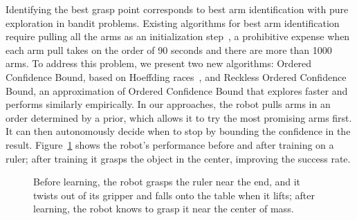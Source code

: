 \documentclass{article}
\newcommand{\algorithmCTxt}{Ordered Confidence Bound\xspace}
\newcommand{\algorithmDTxt}{Reckless Ordered Confidence Bound\xspace}
\begin{document}
Identifying the best grasp point corresponds to best arm
identification with pure exploration in bandit problems.  Existing
algorithms for best arm identification require pulling all the arms as
an initialization step~\citep{mannor04, audibert10, chen14}, a
prohibitive expense when each arm pull takes on the order of 90
seconds and there are more than 1000 arms.  To address this problem,
we present two new algorithms: \algorithmCTxt, based on Hoeffding
races~\citep{maron93}, and \algorithmDTxt, an approximation of
\algorithmCTxt that explores faster and performs similarly
empirically. In our approaches, the robot pulls arms in an order
determined by a prior, which allows it to try the most promising arms
first. It can then autonomously decide when to stop by bounding the
confidence in the result.  Figure~\ref{fig:ruler} shows the robot's
performance before and after training on a ruler; after training it
grasps the object in the center, improving the success rate.
\begin{figure}
%
\caption{Before learning, the robot grasps the ruler near the end, and it twists out of its gripper and falls onto the table when it lifts; after learning, the robot knows to grasp it near the center of mass.\label{fig:ruler}}
\end{figure}
\end{document}
